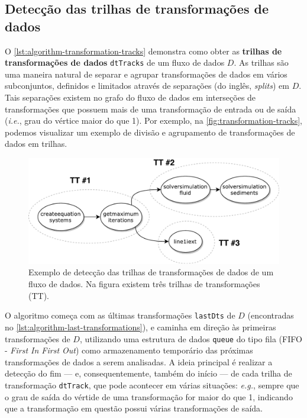 \subsection{Detecção das trilhas de transformações de dados}%
\label{subsec:deteccao-das-trilhas-de-transformacoes}

O \autoref{lst:algorithm-transformation-tracks} demonstra como obter as \textbf{trilhas de transformações de dados} \texttt{dtTracks} de um fluxo de dados \( D \). As trilhas são uma maneira natural de separar e agrupar transformações de dados em vários subconjuntos, definidos e limitados através de separações (do inglês, \textit{splits}) em \( D \). Tais separações existem no grafo do fluxo de dados em interseções de transformações que possuem mais de uma transformação de entrada ou de saída (\textit{i.e.}, grau do vértice maior do que 1). Por exemplo, na \autoref{fig:transformation-tracks}, podemos visualizar um exemplo de divisão e agrupamento de transformações de dados em trilhas.

\begin{figure}[htb]
    \centering
    \includegraphics[width=\textwidth]{img/transformation-tracks}
    \caption[Exemplo de detecção das trilhas de transformações]{Exemplo de detecção das trilhas de transformações de dados de um fluxo de dados. Na figura existem três trilhas de transformações (\textsc{TT}).}%
    \label{fig:transformation-tracks}
\end{figure}

O algoritmo começa com as últimas transformações \texttt{lastDts} de \( D \) (encontradas no \autoref{lst:algorithm-last-transformations}), e caminha em direção às primeiras transformações de \( D \), utilizando uma estrutura de dados \texttt{queue} do tipo fila (FIFO - \textit{First In First Out}) como armazenamento temporário das próximas transformações de dados a serem analisadas. A ideia principal é realizar a detecção do fim --- e, consequentemente, também do início --- de cada trilha de transformação \texttt{dtTrack}, que pode acontecer em várias situações: \textit{e.g.}, sempre que o grau de saída do vértide de uma transformação for maior do que 1, indicando que a transformação em questão possui várias transformações de saída.

